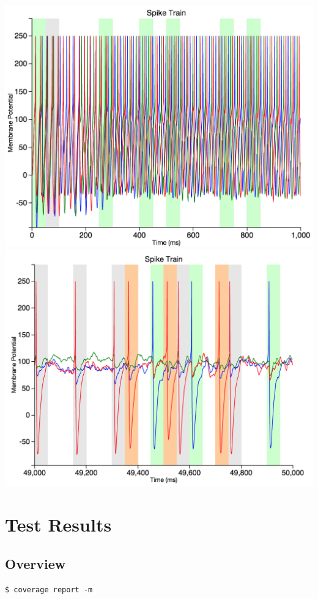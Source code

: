 \documentclass[a4paper,11pt]{article}
\begin{document}
\begin{appendices}
\includegraphics[scale = 0.3]{multiple_beginning}
\includegraphics[scale = 0.3]{multiple_end}
\newpage

\section{Test Results}

\subsection{Overview}
\begin{verbatim}
$ coverage report -m


\end{verbatim}
\end{appendices}
\end{document}
